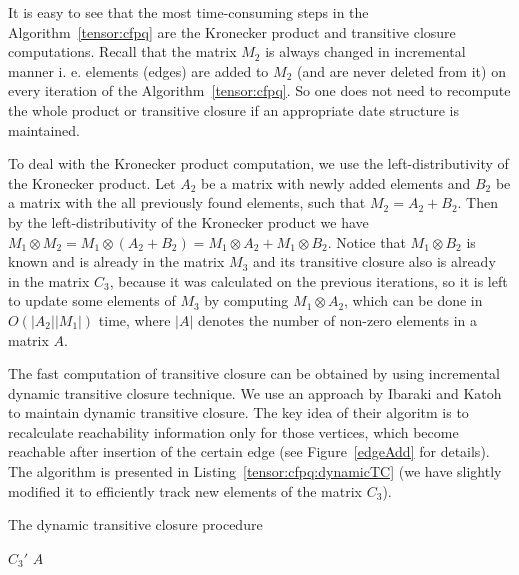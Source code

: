 It is easy to see that the most time-consuming steps in the Algorithm~\ref{tensor:cfpq} are the Kronecker product and transitive closure computations. Recall that the matrix $M_2$ is always changed in incremental manner i. e. elements (edges) are added to $M_2$ (and are never deleted from it) on every iteration of the Algorithm~\ref{tensor:cfpq}. So one does not need to recompute the whole product or transitive closure if an appropriate date structure is maintained.


To deal with the Kronecker product computation, we use the left-distributivity of the Kronecker product. Let $A_2$ be a matrix with newly added elements and $B_2$ be a matrix with the all previously found elements, such that $M_2 = A_2 + B_2$. Then by the left-distributivity of the Kronecker product we have $M_1 \otimes M_2 = M_1 \otimes (A_2 + B_2) = M_1\otimes A_2 + M_1 \otimes B_2$. Notice that $M_1 \otimes B_2$ is known and is already in the matrix $M_3$ and its transitive closure also is already in the matrix $C_3$, because it was calculated on the previous iterations, so it is left to update some elements of $M_3$ by computing $M_1\otimes A_2$,  which can be done in $O(|A_2||M_1|)$ time, where $|A|$ denotes the number of non-zero elements in a matrix $A$.


The fast computation of transitive closure can be obtained by using incremental dynamic transitive closure technique. We use an approach by Ibaraki and Katoh~\cite{IBARAKI198395} to maintain dynamic transitive closure. The key idea of their algoritm is to recalculate reachability information only for those vertices, which become reachable after insertion of the certain edge (see Figure~\ref{edgeAdd} for details). The algorithm is presented in Listing~\ref{tensor:cfpq:dynamicTC} (we have slightly modified it to efficiently track new elements of the matrix $C_3$). 

\begin{algorithm}[h]
\begin{algorithmic}[1]
\footnotesize
\caption{The dynamic transitive closure procedure}
\label{tensor:cfpq:dynamicTC}
        \EndFor
        \State \Return $C_3'$
\EndFunction
        \EndFor
\State \Return $A$
\EndFunction
\EndFunction
\end{algorithmic}
\end{algorithm}

